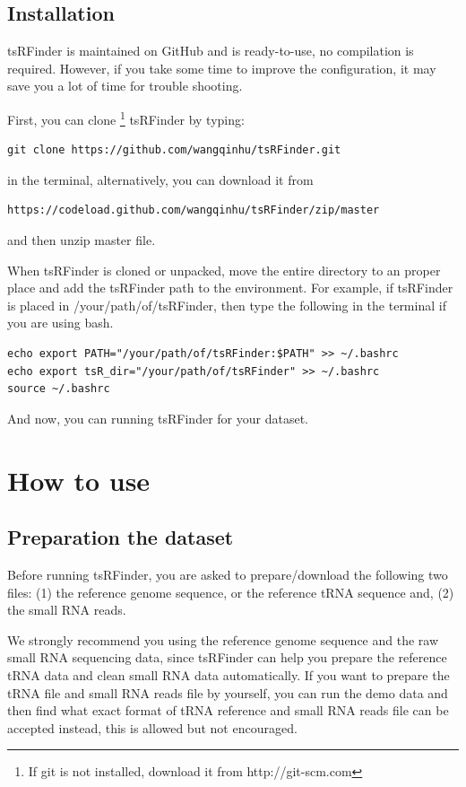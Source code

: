 \documentclass[11pt, a4paper]{article}
\begin{document}
\subsection{Installation}

tsRFinder is maintained on GitHub and is ready-to-use, no compilation is required. However, if you take some time to improve the configuration, it may save you a lot of time for trouble shooting.

First, you can clone \footnote{If git is not installed, download it from http://git-scm.com} tsRFinder by typing:

{\small \begin{verbatim}
git clone https://github.com/wangqinhu/tsRFinder.git
\end{verbatim}}

in the terminal, alternatively, you can download it from

{\small \begin{verbatim}
https://codeload.github.com/wangqinhu/tsRFinder/zip/master
\end{verbatim}
}

and then unzip master file.

When tsRFinder is cloned or unpacked, move the entire directory to an proper place and add the tsRFinder path to the environment. For example, if tsRFinder is placed in /your/path/of/tsRFinder, then type the following in the terminal if you are using bash.

{\small \begin{verbatim}
echo export PATH="/your/path/of/tsRFinder:$PATH" >> ~/.bashrc
echo export tsR_dir="/your/path/of/tsRFinder" >> ~/.bashrc
source ~/.bashrc
\end{verbatim}}

And now, you can running tsRFinder for your dataset.

\section{How to use}

\subsection{Preparation the dataset}

Before running tsRFinder, you are asked to prepare/download the following two files: (1) the reference genome sequence, or the reference tRNA sequence and, (2) the small RNA reads.

We strongly recommend you using the reference genome sequence and the raw small RNA sequencing data, since tsRFinder can help you prepare the reference tRNA data and clean small RNA data automatically. If you want to prepare the tRNA file and small RNA reads file by yourself, you can run the demo data and then find what exact format of tRNA reference and small RNA reads file can be accepted instead, this is allowed but not encouraged. 
\end{document}

